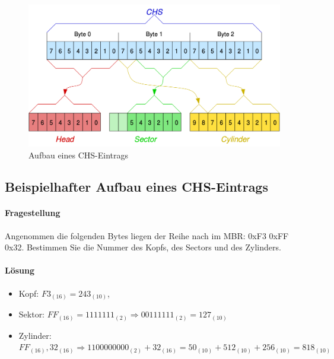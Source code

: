 \documentclass[11pt,a4paper]{article}
\begin{document}
\begin{figure}[h]
	\centering
	\includegraphics[scale=0.3]{images/chs_entry.png}
	\caption{Aufbau eines CHS-Eintrags}
	\label{fig:mbr_chsentry}
\end{figure}

\subsection{Beispielhafter Aufbau eines CHS-Eintrags}
\paragraph{Fragestellung}
Angenommen die folgenden Bytes liegen der Reihe nach
im MBR: 0xF3 0xFF 0x32. Bestimmen Sie die Nummer des Kopfs, des
Sectors und des Zylinders. 
\paragraph{Lösung}
\begin{itemize}
	\item Kopf: \(F3_{(16)} = 243_{(10)}\),
	\item Sektor: \(FF_{(16)} = 1111111_{(2)} \Rightarrow 00111111_{(2)} = 127_{(10)}\) 
	\item Zylinder: \(FF_{(16)}, 32_{(16)} \Rightarrow 1100000000_{(2)} + 32_{(16)} = 50_{(10)} + 512_{(10)} + 256_{(10)} = 818_{(10)}\)
\end{itemize}
\pagebreak{}
\end{document}
